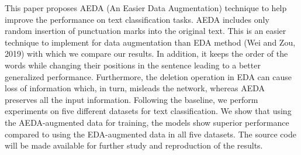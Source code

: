 This paper proposes AEDA (An Easier Data Augmentation) technique to help improve the performance on text classification tasks. AEDA includes only random insertion of punctuation marks into the original text. This is an easier technique to implement for data augmentation than EDA method (Wei and Zou, 2019) with which we compare our results. In addition, it keeps the order of the words while changing their positions in the sentence leading to a better generalized performance. Furthermore, the deletion operation in EDA can cause loss of information which, in turn, misleads the network, whereas AEDA preserves all the input information. Following the baseline, we perform experiments on five different datasets for text classification. We show that using the AEDA-augmented data for training, the models show superior performance compared to using the EDA-augmented data in all five datasets. The source code will be made available for further study and reproduction of the results.

